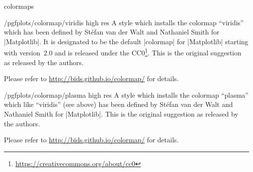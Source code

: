 \begin{pgfplotslibrary}{colormaps}
\begin{stylekey}{/pgfplots/colormap/viridis high res}
    A style which installs the colormap ``viridis'' which has been defined by
    Stéfan van der Walt and Nathaniel Smith for |Matplotlib|. It is
    designated to be the default |colormap| for |Matplotlib| starting with
    version~$2.0$ and is released under the
    CC0\footnote{\url{https://creativecommons.org/about/cc0}}. This is the
    original suggestion as released by the authors.

    Please refer to \url{http://bids.github.io/colormap/} for details.
\begin{codeexample}
\pgfplotsset{
    colormap name=viridis,
}
\end{codeexample}

\begin{codeexample}
\pgfplotsset{
    colormap/viridis high res,
}
\end{codeexample}
\end{stylekey}

\begin{stylekey}{/pgfplots/colormap/plasma high res}
    A style which installs the colormap ``plasma'' which like
    ``viridis'' (see above) has been defined by Stéfan van der Walt and
    Nathaniel Smith for |Matplotlib|. This is the original suggestion as
    released by the authors.

    Please refer to \url{http://bids.github.io/colormap/} for details.
\begin{codeexample}
\pgfplotsset{
    colormap name=plasma,
}
\end{codeexample}

\begin{codeexample}
\pgfplotsset{
    colormap/plasma high res,
}
\end{codeexample}
\end{stylekey}

\end{pgfplotslibrary}
\endgroup
